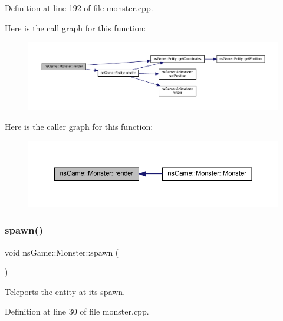 Definition at line 192 of file monster.\+cpp.

Here is the call graph for this function\+:\nopagebreak
\begin{figure}[H]
\begin{center}
\leavevmode
\includegraphics[width=350pt]{classns_game_1_1_monster_afe0b8e0d63cfef2cf0026f81facae620_cgraph}
\end{center}
\end{figure}
Here is the caller graph for this function\+:\nopagebreak
\begin{figure}[H]
\begin{center}
\leavevmode
\includegraphics[width=350pt]{classns_game_1_1_monster_afe0b8e0d63cfef2cf0026f81facae620_icgraph}
\end{center}
\end{figure}
\mbox{\label{classns_game_1_1_monster_a6ee4a9d2cea5d327379de3416a059169}} 
\subsubsection{\texorpdfstring{spawn()}{spawn()}}
{\footnotesize\ttfamily void ns\+Game\+::\+Monster\+::spawn (\begin{DoxyParamCaption}{ }\end{DoxyParamCaption})}



Teleports the entity at its spawn. 



Definition at line 30 of file monster.\+cpp.

